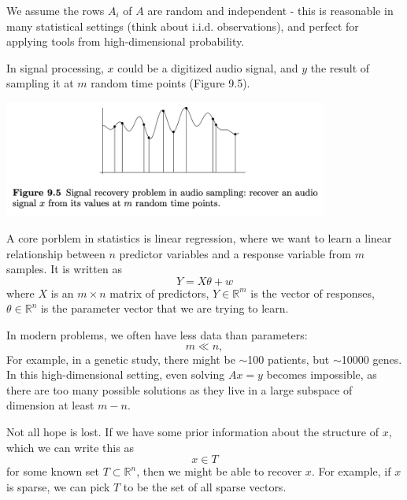 We assume the rows $A_i$ of $A$ are random and independent - this is reasonable in many statistical settings 
(think about i.i.d. observations), and perfect for applying tools from high-dimensional probability.

\begin{example}
\label{ex:9.4.1}
In signal processing, $x$ could be a digitized audio signal, and $y$ the result of sampling it at $m$ random 
time points (Figure 9.5).

\begin{center}
    \includegraphics[width=0.8\textwidth]{Chapter 9/fig9-5.png}
\end{center}
\end{example}

\begin{example}
\label{ex:9.4.2}
A core porblem in statistics is linear regression, where we want to learn a linear relationship between $n$ 
predictor variables and a response variable from $m$ samples. It is written as 
\[ Y = X \theta + w \]
where $X$ is an $m \times n$ matrix of predictors, $Y \in \mathbb{R}^m$ is the vector of responses, $\theta \in 
\mathbb{R}^n$ is the parameter vector that we are trying to learn.
\end{example}

\begin{remark}
\label{rmk:9.4.3}
In modern problems, we often have less data than parameters: 
\[ m \ll n, \]
For example, in a genetic study, there might be $\sim$100 patients, but $\sim$10000 genes. In this 
high-dimensional setting, even solving $Ax  = y$ becomes impossible, as there are too many possible solutions 
as they live in a large subspace of dimension at least $m - n$.

Not all hope is lost. If we have some prior information about the structure of $x$, which we can write this as 
\[ x \in T \]
for some known set $T \subset \mathbb{R}^n$, then we might be able to recover $x$. For example, if $x$ is 
sparse, we can pick $T$ to be the set of all sparse vectors.
\end{remark}


